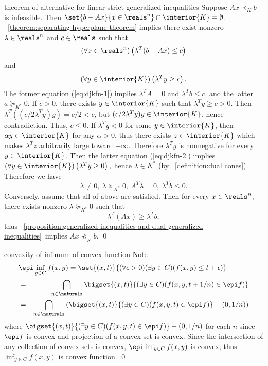 \documentclass[17pt,landscape]{foils}
\begin{document}
{{{\begin{myproof}{theorem of alternative for linear strict generalized inequalities}
	Suppose $A x\prec_{K} b$ is infeasible.
	Then $\set{b-Ax}{x\in\reals^n} \cap \interior{K} = \emptyset$.
	\theoremname~\ref{theorem:separating hyperplane theorem}
	implies
	there exist nonzero $\lambda\in\reals^n$ and $c\in\reals$
	such that
	\begin{equation}
	\label{eq:djkfn-1}
		\left(
			\forall x\in\reals^n
		\right)
		\left(
			\lambda^T(b-Ax)\leq c
		\right)
	\end{equation}
	and
	\begin{equation}
	\label{eq:djkfn-2}
		\left(
			\forall y\in\interior{K}
		\right)
		\left(
			\lambda^Ty \geq c
		\right).
	\end{equation}
	The former equation (\ref{eq:djkfn-1})
	implies $\lambda^TA = 0$ and $\lambda^Tb\leq c$.
	and the latter $a\succeq_{K^\ast}0$.
	If $c>0$, there exists $y\in \interior{K}$ such that $\lambda^T y \geq c >0$.
	Then $\lambda^T ((c/2\lambda^T y)y) = c/2 < c$,
	but $(c/2\lambda^T y)y\in \interior{K}$, hence contradiction.
	Thus, $c\leq0$.
	If $\lambda^T y <0$ for some $y\in \interior{K}$,
	then $\alpha y \in \interior{K}$ for any $\alpha>0$,
	thus there exists $z\in \interior{K}$ which makes $\lambda^T z$ arbitrarily large toward $-\infty$.
	Therefore $\lambda^T y$ is nonnegative for every $y\in \interior{K}$.
	Then the latter equation (\ref{eq:djkfn-2})
	implies
	$
		\left(
			\forall y\in\interior{K}
		\right)
		\left(
			\lambda^Ty \geq 0
		\right),
	$
	hence $\lambda\in K^\ast$ (by ~\ref{definition:dual cones}).
	Therefore we have
	$$
		\lambda \neq0,\ %
		\lambda \succeq_{K^\ast} 0,\ %
		A^T \lambda = 0,\ %
		\lambda^T b \leq0.
	$$
	Conversely, assume that all of above are satisfied.
	Then for every $x\in\reals^n$,
	there exists nonzero $\lambda \succeq_{K^\ast}0$
	such that
	$$
		\lambda^T (Ax) \geq \lambda^Tb,
	$$
	thus \propositionname~\ref{proposition:generalized inequalities and dual generalized inequalities}\
	implies $Ax \not\prec_K b$.
	\qed\
\end{myproof}

\begin{myproof}{convexity of infimum of convex function}
	Note
	\begin{eqnarray*}
		\lefteqn{
				\epi \inf_{y\in C} f(x,y)
				=\set{(x,t)}{(\forall \epsilon >0)(\exists y\in C)( f(x,y)\leq t + \epsilon)}
		}
		\\
		&=&
			\bigcap_{n\in\naturals} \bigset{(x,t)}{(\exists y\in C)( f(x,y, t + 1/n) \in \epi f)}
		\\
		&=&
			\bigcap_{n\in\naturals} \left(\bigset{(x,t)}{(\exists y\in C)( f(x,y, t) \in \epi f)} - (0,1/n)\right)
	\end{eqnarray*}
	where $\bigset{(x,t)}{(\exists y\in C)( f(x,y, t) \in \epi f)} - (0,1/n)$
	for each $n$ since $\epi f$ is convex and projection of a convex set is convex.
	Since the intersection of any collection of convex sets is convex,
	$\epi \inf_{y\in C} f(x,y)$ is convex,
	thus $\inf_{y\in C} f(x,y)$ is convex function.
	\qed\
\end{myproof}

}}}
\end{document}
